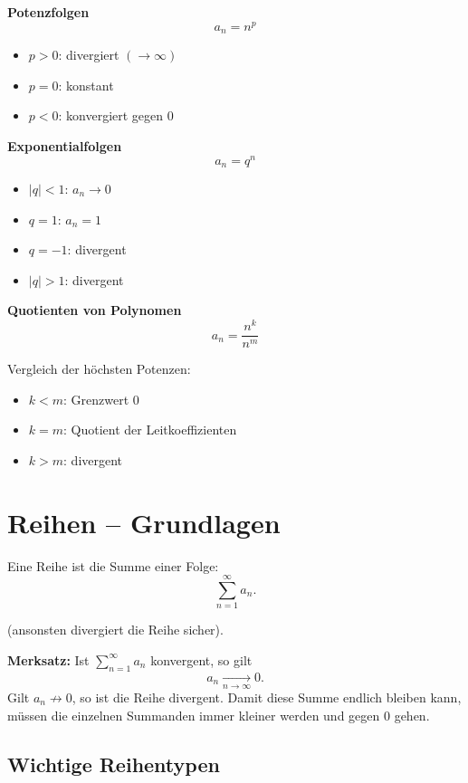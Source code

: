     \textbf{Potenzfolgen}
    \[
    a_n = n^p
    \]
    
    \begin{itemize}
        \item $p>0$: divergiert $(\to \infty)$
        \item $p=0$: konstant
        \item $p<0$: konvergiert gegen $0$
    \end{itemize}
    
    \textbf{Exponentialfolgen}
    \[
    a_n = q^n
    \]
    
    \begin{itemize}
        \item $|q|<1$: $a_n \to 0$
        \item $q=1$: $a_n = 1$
        \item $q=-1$: divergent
        \item $|q|>1$: divergent
    \end{itemize}
    
    \textbf{Quotienten von Polynomen}
    \[
    a_n = \frac{n^k}{n^m}
    \]
    
    Vergleich der höchsten Potenzen:
    \begin{itemize}
        \item $k<m$: Grenzwert $0$
        \item $k=m$: Quotient der Leitkoeffizienten
        \item $k>m$: divergent
    \end{itemize}
    
    \section{Reihen – Grundlagen}
    
    Eine Reihe ist die Summe einer Folge:
    \[
    \sum_{n=1}^{\infty} a_n.
    \]
    
    (ansonsten divergiert die Reihe sicher).
    
    \textbf{Merksatz:}  
    Ist $\displaystyle \sum_{n=1}^{\infty} a_n$ konvergent, so gilt
    \[
    a_n \xrightarrow[n\to\infty]{} 0.
    \]
    Gilt $a_n \not\to 0$, so ist die Reihe divergent. Damit diese Summe endlich bleiben kann, müssen die einzelnen Summanden immer kleiner werden und gegen 0 gehen.
    
    
    \subsection{Wichtige Reihentypen}
    
